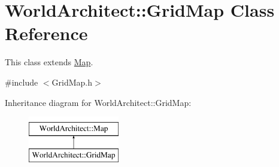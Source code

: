 \hypertarget{class_world_architect_1_1_grid_map}{}\section{World\+Architect\+::Grid\+Map Class Reference}
\label{class_world_architect_1_1_grid_map}


This class extends \mbox{\hyperlink{class_world_architect_1_1_map}{Map}}.  




{\ttfamily \#include $<$Grid\+Map.\+h$>$}

Inheritance diagram for World\+Architect\+::Grid\+Map\+:\begin{figure}[H]
\begin{center}
\leavevmode
\includegraphics[height=2.000000cm]{class_world_architect_1_1_grid_map}
\end{center}
\end{figure}
